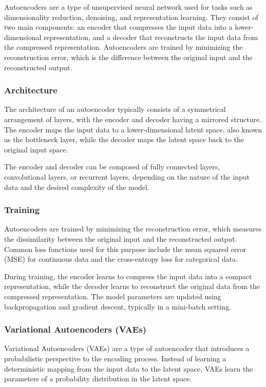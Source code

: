 \documentclass[12pt]{article}
\begin{document}
Autoencoders are a type of unsupervised neural network used for tasks such as dimensionality reduction, denoising, and representation learning. They consist of two main components: an encoder that compresses the input data into a lower-dimensional representation, and a decoder that reconstructs the input data from the compressed representation. Autoencoders are trained by minimizing the reconstruction error, which is the difference between the original input and the reconstructed output.

\subsubsection{Architecture}

The architecture of an autoencoder typically consists of a symmetrical arrangement of layers, with the encoder and decoder having a mirrored structure. The encoder maps the input data to a lower-dimensional latent space, also known as the bottleneck layer, while the decoder maps the latent space back to the original input space.

The encoder and decoder can be composed of fully connected layers, convolutional layers, or recurrent layers, depending on the nature of the input data and the desired complexity of the model.

\subsubsection{Training}

Autoencoders are trained by minimizing the reconstruction error, which measures the dissimilarity between the original input and the reconstructed output. Common loss functions used for this purpose include the mean squared error (MSE) for continuous data and the cross-entropy loss for categorical data.

During training, the encoder learns to compress the input data into a compact representation, while the decoder learns to reconstruct the original data from the compressed representation. The model parameters are updated using backpropagation and gradient descent, typically in a mini-batch setting.

\subsubsection{Variational Autoencoders (VAEs)}

Variational Autoencoders (VAEs) are a type of autoencoder that introduces a probabilistic perspective to the encoding process. Instead of learning a deterministic mapping from the input data to the latent space, VAEs learn the parameters of a probability distribution in the latent space.
\end{document}
